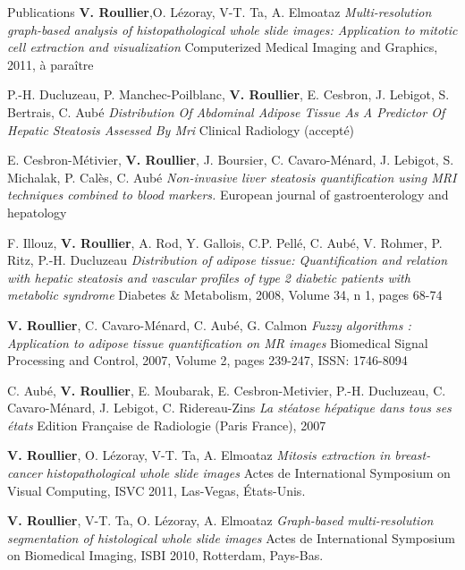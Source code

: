 

\begin{rubric}{Publications}
  \entry*[2011]
  \textbf{V. Roullier},O. Lézoray, V-T. Ta, A. Elmoataz
  \textit{Multi-resolution graph-based analysis of histopathological
    whole slide images: Application to mitotic cell extraction and
    visualization} 
  Computerized Medical Imaging and Graphics, 2011, à paraître

  \entry*[2010]
  P.-H. Ducluzeau, P. Manchec-Poilblanc, \textbf{V. Roullier}, E. Cesbron, J. Lebigot, S. Bertrais, C. Aubé
  \textit{Distribution Of Abdominal Adipose Tissue As A Predictor Of Hepatic Steatosis Assessed By Mri}
  Clinical Radiology (accepté)
  
  \entry*[2010]
  E. Cesbron-Métivier, \textbf{V. Roullier}, J. Boursier, C. Cavaro-Ménard, J. Lebigot, S. Michalak, P. Calès, C. Aubé
  \textit{Non-invasive liver steatosis quantification using MRI techniques combined to blood markers.}
  European journal of gastroenterology and hepatology
  
  \entry*[2008]
  F. Illouz, \textbf{V. Roullier}, A. Rod, Y. Gallois, C.P. Pellé, C. Aubé, V. Rohmer, P. Ritz, P.-H. Ducluzeau
  \textit{Distribution of adipose tissue: Quantification and relation with hepatic steatosis and vascular profiles of type 2 diabetic patients with metabolic syndrome} 
  Diabetes \& Metabolism, 2008, Volume 34, n 1, pages 68-74 
  
  \entry*[2008] 
  \textbf{V. Roullier}, C. Cavaro-Ménard, C. Aubé, G. Calmon
  \textit{Fuzzy algorithms : Application to adipose tissue quantification on MR images}
  Biomedical Signal Processing and Control, 2007, Volume 2, pages 239-247, ISSN: 1746-8094

  \entry*[2007]
  C. Aubé, \textbf{V. Roullier}, E. Moubarak, E. Cesbron-Metivier, P.-H. Ducluzeau, C. Cavaro-Ménard, J. Lebigot, C. Ridereau-Zins
  \textit{La stéatose hépatique dans tous ses états}
  Edition Française de Radiologie (Paris France), 2007
  
  \entry*[2011]
  \textbf{V. Roullier}, O. Lézoray, V-T. Ta, A. Elmoataz
  \textit{Mitosis extraction in breast-cancer histopathological whole slide images}
  Actes de International Symposium on Visual Computing, ISVC 2011,
  Las-Vegas, États-Unis.
  
  \entry*[2010]
  \textbf{V. Roullier}, V-T. Ta, O. L{\'e}zoray, A. Elmoataz
  \textit{Graph-based multi-resolution segmentation of histological whole slide images}
  Actes de International Symposium on Biomedical Imaging, ISBI 2010, Rotterdam, Pays-Bas.
  

\end{rubric}
